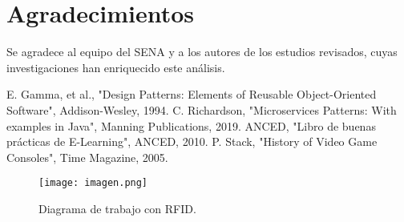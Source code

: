 \documentclass[conference]{IEEEtran}
\begin{document}
\section*{Agradecimientos}
Se agradece al equipo del SENA y a los autores de los estudios revisados, cuyas investigaciones han enriquecido este an\'alisis.

\begin{thebibliography}{1}
 E. Gamma, et al., "Design Patterns: Elements of Reusable Object-Oriented Software", Addison-Wesley, 1994.
 C. Richardson, "Microservices Patterns: With examples in Java", Manning Publications, 2019.
 ANCED, "Libro de buenas pr\'acticas de E-Learning", ANCED, 2010.
 P. Stack, "History of Video Game Consoles", Time Magazine, 2005.
\end{thebibliography}
\begin{figure}[h]
\centering
\texttt{[image: imagen.png]} %
\caption{Diagrama de trabajo con RFID.}
\label{fig:rfid-diagram}
\end{figure}
\end{document}
